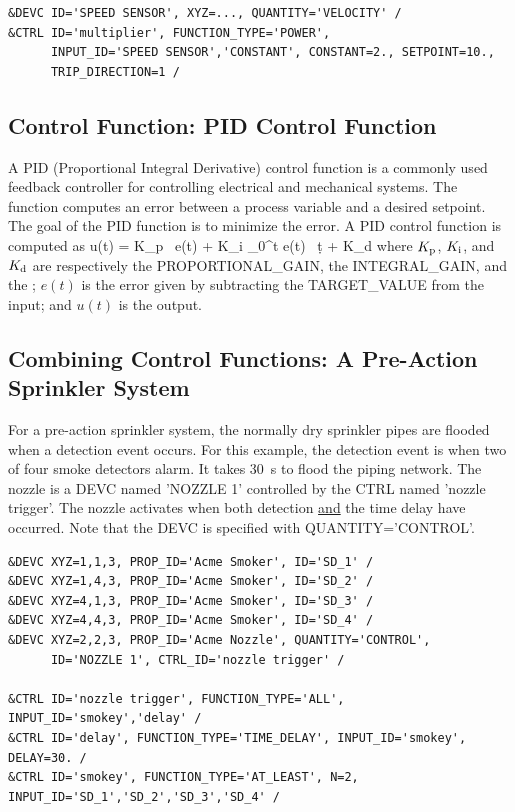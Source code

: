 \documentclass[11pt]{book}
\begin{document}
\begin{lstlisting}
&DEVC ID='SPEED SENSOR', XYZ=..., QUANTITY='VELOCITY' /
&CTRL ID='multiplier', FUNCTION_TYPE='POWER',
      INPUT_ID='SPEED SENSOR','CONSTANT', CONSTANT=2., SETPOINT=10.,
      TRIP_DIRECTION=1 /
\end{lstlisting}


\subsection{Control Function: PID Control Function}
\label{info:CONTROL_PID}

A PID (Proportional Integral Derivative) control function is a commonly used feedback controller for controlling electrical and mechanical systems.  The function computes an error between a process variable and a desired setpoint.  The goal of the PID function is to minimize the error.  A PID control function is computed as
\be u(t) \; = \; K_{\rm p} \, e(t) \; + \; \; K_{\rm i} \int_0^t \! e(t) \, \d t   \; + \; K_{\rm d} \ee
where $K_{\rm p}$, $K_{\rm i}$, and $K_{\rm d}$ are respectively the {\ct PROPORTIONAL\_GAIN}, the {\ct INTEGRAL\_GAIN}, and the
; $e(t)$ is the error given by subtracting the {\ct TARGET\_VALUE} from the input; and $u(t)$ is the output.

\subsection{Combining Control Functions: A Pre-Action Sprinkler System}

For a pre-action sprinkler system, the normally
dry sprinkler pipes are flooded when a detection event occurs. For this example, the detection event is
when two of four smoke detectors alarm.  It takes 30~s to flood the piping network.
The nozzle is a {\ct DEVC} named {\ct 'NOZZLE 1'} controlled by the {\ct CTRL} named {\ct 'nozzle trigger'}.
The nozzle activates when both detection \underline{and} the time delay have occurred.  Note that the {\ct DEVC} is
specified with {\ct QUANTITY='CONTROL'}.

\begin{lstlisting}
&DEVC XYZ=1,1,3, PROP_ID='Acme Smoker', ID='SD_1' /
&DEVC XYZ=1,4,3, PROP_ID='Acme Smoker', ID='SD_2' /
&DEVC XYZ=4,1,3, PROP_ID='Acme Smoker', ID='SD_3' /
&DEVC XYZ=4,4,3, PROP_ID='Acme Smoker', ID='SD_4' /
&DEVC XYZ=2,2,3, PROP_ID='Acme Nozzle', QUANTITY='CONTROL',
      ID='NOZZLE 1', CTRL_ID='nozzle trigger' /

&CTRL ID='nozzle trigger', FUNCTION_TYPE='ALL', INPUT_ID='smokey','delay' /
&CTRL ID='delay', FUNCTION_TYPE='TIME_DELAY', INPUT_ID='smokey', DELAY=30. /
&CTRL ID='smokey', FUNCTION_TYPE='AT_LEAST', N=2, INPUT_ID='SD_1','SD_2','SD_3','SD_4' /
\end{lstlisting}
\end{document}
